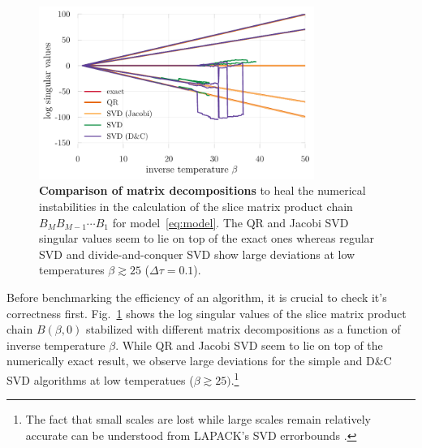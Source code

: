 \documentclass[submission, Phys]{SciPost}
\begin{document}
\begin{figure}
	\centering
	\includegraphics[width=0.8\textwidth]{figures/decomp_comparison_simple.pdf}
	\caption{\textbf{Comparison of matrix decompositions} to heal the numerical instabilities in the calculation of the slice matrix product chain $B_M B_{M-1} \cdots B_1$ for model~\eqref{eq:model}. The QR and Jacobi SVD singular values seem to lie on top of the exact ones whereas regular SVD and divide-and-conquer SVD show large deviations at low temperatures $\beta \gtrsim 25$ ($\Delta \tau = 0.1$).}
	\label{fig:decomp_comparison_simple}
\end{figure}

Before benchmarking the efficiency of an algorithm, it is crucial to check it's correctness first. Fig.~\ref{fig:decomp_comparison_simple} shows the log singular values of the slice matrix product chain $B(\beta, 0)$ stabilized with different matrix decompositions as a function of inverse temperature $\beta$. While QR and Jacobi SVD seem to lie on top of the numerically exact result, we observe large deviations for the simple and D\&C SVD algorithms at low temperatues ($\beta \gtrsim 25)$.\footnote{The fact that small scales are lost while large scales remain relatively accurate can be understood from LAPACK's SVD errorbounds \cite{errorbounds}.}\\
\end{document}

